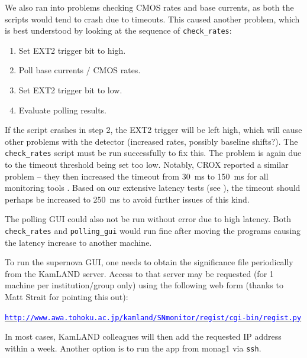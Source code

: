 \documentclass[a4paper,10pt]{article}
\newcommand{\link}[1]{\href{#1}{\textcolor{blue}{\texttt{#1}}}} %
\begin{document}
We also ran into problems checking CMOS rates and base currents, as both the scripts would tend to crash due to timeouts. This caused another problem, which is best understood by looking at the sequence of {\tt check\_rates}:
\begin{enumerate}
	\item Set EXT2 trigger bit to high.
	\item Poll base currents / CMOS rates.
	\item Set EXT2 trigger bit to low.
	\item Evaluate polling results.
\end{enumerate}
If the script crashes in step 2, the EXT2 trigger will be left high, which will cause other problems with the detector (increased rates, possibly baseline shifts?). The {\tt check\_rates} script must be run successfully to fix this. The problem is again due to the timeout threshold being set too low. Notably, CROX reported a similar problem -- they then increased the timeout from 30~ms to 150~ms for all monitoring tools \cite{doc5051}. Based on our extensive latency tests (see ), the timeout should perhaps be increased to 250~ms to avoid further issues of this kind.

The polling GUI could also not be run without error due to high latency. Both {\tt check\_rates} and {\tt polling\_gui} would run fine after moving the programs causing the latency increase to another machine.

To run the supernova GUI, one needs to obtain the significance file periodically from the KamLAND server. Access to that server may be requested (for 1 machine per institution/group only) using the following web form (thanks to Matt Strait for pointing this out):

\qquad\link{http://www.awa.tohoku.ac.jp/kamland/SNmonitor/regist/cgi-bin/regist.py}

In most cases, KamLAND colleagues will then add the requested IP address within a week.
Another option is to run the app from monag1 via {\tt ssh}.

\end{document}
